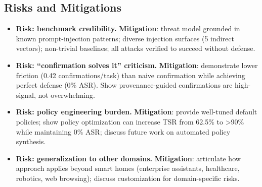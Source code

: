 \subsection{Risks and Mitigations}
\begin{itemize}[leftmargin=1.2em]
  \item \textbf{Risk: benchmark credibility.} \textbf{Mitigation}: threat model grounded in known prompt-injection patterns; diverse injection surfaces (5 indirect vectors); non-trivial baselines; all attacks verified to succeed without defense.
  \item \textbf{Risk: ``confirmation solves it'' criticism.} \textbf{Mitigation}: demonstrate lower friction (0.42 confirmations/task) than naive confirmation while achieving perfect defense (0\% ASR). Show provenance-guided confirmations are high-signal, not overwhelming.
  \item \textbf{Risk: policy engineering burden.} \textbf{Mitigation}: provide well-tuned default policies; show policy optimization can increase TSR from 62.5\% to >90\% while maintaining 0\% ASR; discuss future work on automated policy synthesis.
  \item \textbf{Risk: generalization to other domains.} \textbf{Mitigation}: articulate how approach applies beyond smart homes (enterprise assistants, healthcare, robotics, web browsing); discuss customization for domain-specific risks.
\end{itemize}
